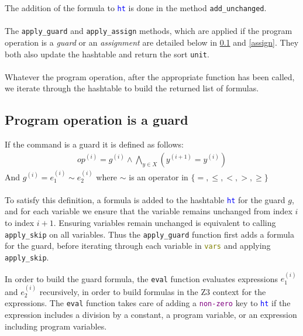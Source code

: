 \documentclass[letterpaper,12pt]{article}
\begin{document}
The addition of the formula to \texttt{\textcolor{blue}{ht}} is done in the method \texttt{add\_unchanged}.
\paragraph{}
The \texttt{apply\_guard} and \texttt{apply\_assign} methods, which are applied if the program operation is a \textit{guard} or an \textit{assignment} are detailed below in \ref{guard} and \ref{assign}.
They both also update the hashtable and return the sort \texttt{unit}.
\paragraph{}
Whatever the program operation, after the appropriate function has been called, we iterate through the hashtable to build the returned list of formulas.

\subsection{Program operation is a guard}\label{guard}
If the command is a guard it is defined as follows:
\begin{align*}
op^{(i)} = g^{(i)} \wedge \bigwedge_{y \in X}(y^{(i+1)} = y^{(i)})
\end{align*}
And $ g^{(i)} = e_1^{(i)} \sim e_2^{(i)}$ where  $\sim$ is an operator in $ \{ = ,\leq, < , >, \geq \}$  

\paragraph{}
To satisfy this definition, a formula is added to the hashtable \texttt{\textcolor{blue}{ht}} for the guard $g$, and for each variable we ensure that the variable remains unchanged from index $i$ to index $i+1$. 
Ensuring variables remain unchanged is equivalent to calling \texttt{apply\_skip} on all variables.
Thus the \texttt{apply\_guard} function first adds a formula for the guard, before iterating through each variable in \texttt{\textcolor{olive}{vars}}  and applying \texttt{apply\_skip}.

In order to build the guard formula, the \texttt{eval} function evaluates expressions $e_1^{(i)}$ and $e_2^{(i)}$ recursively, in order to build formulas in the Z3 context for the expressions. The \texttt{eval} function takes care of adding a \texttt{\textcolor{purple}{non-zero}} key to \texttt{\textcolor{blue}{ht}} if the expression includes a division by a constant, a program variable, or an expression including program variables.
\end{document}
